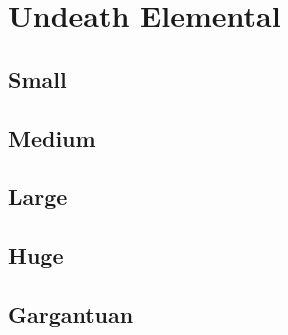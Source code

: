 \section{Undeath Elemental}

\subsection{Small}

\subsection{Medium}

\subsection{Large}

\subsection{Huge}

\subsection{Gargantuan}